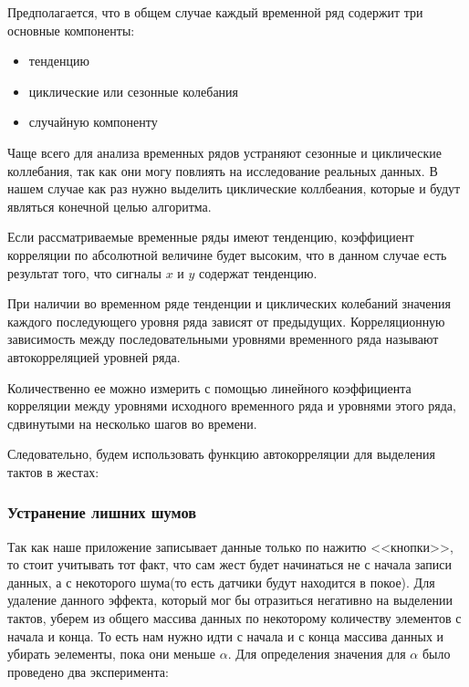 Предполагается, что в общем случае каждый временной ряд содержит три основные компоненты:
\begin{itemize}
    \item тенденцию
    \item циклические или сезонные колебания
    \item случайную компоненту
\end{itemize}
Чаще всего для анализа временных рядов устраняют сезонные и циклические коллебания, так как они могу повлиять на исследование реальных данных. В нашем случае как раз нужно выделить циклические коллбеания, которые и будут являться конечной целью алгоритма.

Если рассматриваемые временные ряды имеют тенденцию, коэффициент корреляции по абсолютной величине будет высоким, что в данном случае есть результат того, что сигналы $x$ и $y$ содержат тенденцию.

При наличии во временном ряде тенденции и циклических колебаний значения каждого последующего уровня ряда зависят от предыдущих. Корреляционную зависимость между последовательными уровнями временного ряда называют автокорреляцией уровней ряда.

Количественно ее можно измерить с помощью линейного коэффициента корреляции между уровнями исходного временного ряда и уровнями этого ряда, сдвинутыми на несколько шагов во времени.

Следовательно, будем использовать функцию автокорреляции для выделения тактов в жестах:

\subsubsection{Устранение лишних шумов}
Так как наше приложение записывает данные только по нажитю <<кнопки>>, то стоит учитывать тот факт, что сам жест будет начинаться не с начала записи данных, а с некоторого шума(то есть датчики будут находится в покое). Для удаление данного эффекта, который мог бы отразиться негативно на выделении тактов, уберем из общего массива данных по некоторому количеству элементов с начала и конца. То есть нам нужно идти с начала и с конца массива данных и убирать эелементы, пока они меньше $\alpha$. Для определения значения для $\alpha$ было проведено два эксперимента:

